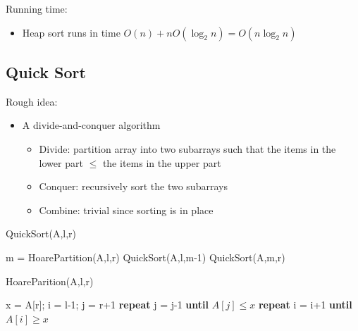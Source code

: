 Running time: 
\begin{itemize}
    \item Heap sort runs in time $O(n)+nO(\log_2 n)=O(n \log_2 n)$
\end{itemize}

\subsection{Quick Sort}
Rough idea:
\begin{itemize}
    \item A divide-and-conquer algorithm
    \begin{itemize}
        \item Divide: partition array into two subarrays such that the items in the lower part $\leq$ the items in the upper part
        \item Conquer: recursively sort the two subarrays
        \item Combine: trivial since sorting is in place
    \end{itemize}
\end{itemize}

\begin{center}
\begin{minipage}{0.6\textwidth} %
\centering %
\begin{algorithm}[H]
\caption{QuickSort(A,l,r)}
 {
m = HoarePartition(A,l,r)\;
QuickSort(A,l,m-1)\;
QuickSort(A,m,r)\;
}
\end{algorithm}
\end{minipage}
\end{center}

\begin{center}
\begin{minipage}{0.6\textwidth} %
\centering %
\begin{algorithm}[H]
\caption{HoareParition(A,l,r)}
x = A[r]; i = l-1; j = r+1\;
 {
\textbf{repeat} j = j-1 \textbf{until} $A[j]\leq x$\;
\textbf{repeat} i = i+1 \textbf{until} $A[i]\geq x$\;
}
\end{algorithm}
\end{minipage}
\end{center}

